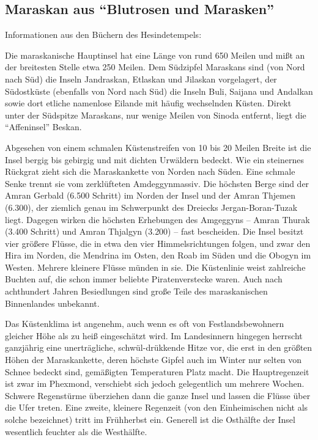 \subsection{Maraskan aus ``Blutrosen und Marasken''}
Informationen aus den Büchern des Hesindetempels:

Die maraskanische Hauptinsel hat eine Länge von rund 650 Meilen und mißt an der breitesten Stelle etwa 250 Meilen. Dem Südzipfel Maraskans sind (von Nord nach Süd) die Inseln Jandraskan, Etlaskan und Jilaskan vorgelagert, der Südostküste (ebenfalls von Nord nach Süd) die Inseln Buli, Saijana und Andalkan sowie dort etliche namenlose Eilande mit häufig wechselnden Küsten. Direkt unter der Südspitze Maraskans, nur wenige Meilen von Sinoda entfernt, liegt die ``Affeninsel'' Beskan.

Abgesehen von einem schmalen Küstenstreifen von 10 bis 20 Meilen Breite ist die Insel bergig bis gebirgig und mit dichten Urwäldern bedeckt. Wie ein steinernes Rückgrat zieht sich die Maraskankette von Norden nach Süden. Eine schmale Senke trennt sie vom zerklüfteten Amdeggynmassiv. Die höchsten Berge sind der Amran Gerbald (6.500 Schritt) im Norden der Insel und der Amran Thjemen (6.300), der ziemlich genau im Schwerpunkt des Dreiecks Jergan-Boran-Tuzak liegt. Dagegen wirken die höchsten Erhebungen des Amgeggyns -- Amran Thurak (3.400 Schritt) und Amran Thjalgyn (3.200) -- fast bescheiden. Die Insel besitzt vier größere Flüsse, die in etwa den vier Himmelsrichtungen folgen, und zwar den Hira im Norden, die Mendrina im Osten, den Roab im Süden und die Obogyn im Westen. Mehrere kleinere Flüsse münden in sie. Die Küstenlinie weist zahlreiche Buchten auf, die schon immer beliebte Piratenverstecke waren. Auch nach achthundert
Jahren Besiedlungen sind große Teile des maraskanischen Binnenlandes unbekannt.

Das Küstenklima ist angenehm, auch wenn es oft von Festlandsbewohnern gleicher Höhe als zu heiß eingeschätzt wird. Im Landesinnern hingegen herrscht ganzjährig eine unerträgliche, schwül-drükkende Hitze vor, die erst in den größten Höhen der Maraskankette, deren höchste Gipfel auch im Winter nur selten von Schnee bedeckt sind, gemäßigten Temperaturen Platz macht. Die Hauptregenzeit ist zwar im Phexmond, verschiebt sich jedoch gelegentlich um mehrere Wochen. Schwere Regenstürme überziehen dann die ganze Insel und lassen die Flüsse über die Ufer treten. Eine zweite, kleinere Regenzeit (von den Einheimischen nicht als solche bezeichnet) tritt im Frühherbst ein. Generell ist die Osthälfte der Insel wesentlich feuchter als
die Westhälfte.

